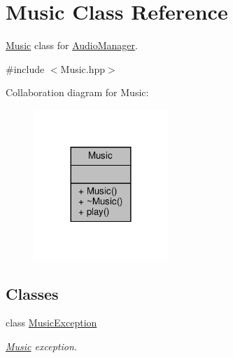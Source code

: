 \hypertarget{class_music}{}\section{Music Class Reference}
\label{class_music}


\hyperlink{class_music}{Music} class for \hyperlink{class_audio_manager}{Audio\+Manager}.  




{\ttfamily \#include $<$Music.\+hpp$>$}



Collaboration diagram for Music\+:
\nopagebreak
\begin{figure}[H]
\begin{center}
\leavevmode
\includegraphics[width=144pt]{class_music__coll__graph}
\end{center}
\end{figure}
\subsection*{Classes}
\begin{DoxyCompactItemize}
\item 
class \hyperlink{class_music_1_1_music_exception}{Music\+Exception}
\begin{DoxyCompactList}\small\item\em \hyperlink{class_music}{Music} exception. \end{DoxyCompactList}\end{DoxyCompactItemize}
